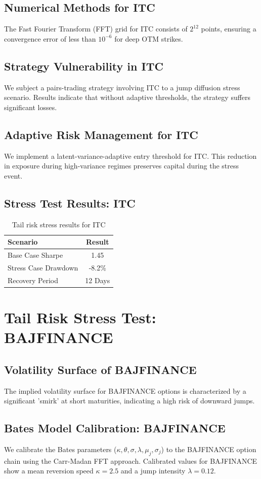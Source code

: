 \documentclass[12pt,a4paper,twoside]{article}
\begin{document}
\subsection{Numerical Methods for ITC}
The Fast Fourier Transform (FFT) grid for ITC consists of $2^{12}$ points, ensuring a convergence error of less than $10^{-6}$ for deep OTM strikes.
\subsection{Strategy Vulnerability in ITC}
We subject a pairs-trading strategy involving ITC to a jump diffusion stress scenario. Results indicate that without adaptive thresholds, the strategy suffers significant losses.
\subsection{Adaptive Risk Management for ITC}
We implement a latent-variance-adaptive entry threshold for ITC. This reduction in exposure during high-variance regimes preserves capital during the stress event.
\subsection{Stress Test Results: ITC}
\begin{table}[H]
\centering
\begin{tabular}{|l|c|}
\hline
Scenario & Result \\
\hline
Base Case Sharpe & 1.45 \\
Stress Case Drawdown & -8.2\% \\
Recovery Period & 12 Days \\
\hline
\end{tabular}
\caption{Tail risk stress results for ITC}
\end{table}
\newpage

\section{Tail Risk Stress Test: BAJFINANCE}
\subsection{Volatility Surface of BAJFINANCE}
The implied volatility surface for BAJFINANCE options is characterized by a significant 'smirk' at short maturities, indicating a high risk of downward jumps.
\subsection{Bates Model Calibration: BAJFINANCE}
We calibrate the Bates parameters ($\kappa, \theta, \sigma, \lambda, \mu_j, \sigma_j$) to the BAJFINANCE option chain using the Carr-Madan FFT approach.
Calibrated values for BAJFINANCE show a mean reversion speed $\kappa = 2.5$ and a jump intensity $\lambda = 0.12$.
\end{document}
